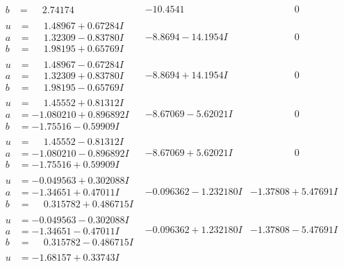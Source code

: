 \documentclass[1p]{elsarticle_modified}
\theoremstyle{definition}
\begin{document}
$$\begin{array}{c|c|c}
\begin{aligned}
b &= \phantom{-}2.74174\phantom{ +0.000000I}\end{aligned}
 & -10.4541\phantom{ +0.000000I} & \phantom{-0.000000 } 0 \\ \hline\begin{aligned}
u &= \phantom{-}1.48967 + 0.67284 I \\
a &= \phantom{-}1.32309 - 0.83780 I \\
b &= \phantom{-}1.98195 + 0.65769 I\end{aligned}
 & -8.8694 - 14.1954 I & \phantom{-0.000000 } 0 \\ \hline\begin{aligned}
u &= \phantom{-}1.48967 - 0.67284 I \\
a &= \phantom{-}1.32309 + 0.83780 I \\
b &= \phantom{-}1.98195 - 0.65769 I\end{aligned}
 & -8.8694 + 14.1954 I & \phantom{-0.000000 } 0 \\ \hline\begin{aligned}
u &= \phantom{-}1.45552 + 0.81312 I \\
a &= -1.080210 + 0.896892 I \\
b &= -1.75516 - 0.59909 I\end{aligned}
 & -8.67069 - 5.62021 I & \phantom{-0.000000 } 0 \\ \hline\begin{aligned}
u &= \phantom{-}1.45552 - 0.81312 I \\
a &= -1.080210 - 0.896892 I \\
b &= -1.75516 + 0.59909 I\end{aligned}
 & -8.67069 + 5.62021 I & \phantom{-0.000000 } 0 \\ \hline\begin{aligned}
u &= -0.049563 + 0.302088 I \\
a &= -1.34651 + 0.47011 I \\
b &= \phantom{-}0.315782 + 0.486715 I\end{aligned}
 & -0.096362 - 1.232180 I & -1.37808 + 5.47691 I \\ \hline\begin{aligned}
u &= -0.049563 - 0.302088 I \\
a &= -1.34651 - 0.47011 I \\
b &= \phantom{-}0.315782 - 0.486715 I\end{aligned}
 & -0.096362 + 1.232180 I & -1.37808 - 5.47691 I \\ \hline\begin{aligned}
u &= -1.68157 + 0.33743 I \\

\end{aligned}
\end{array}$$
\end{document}
